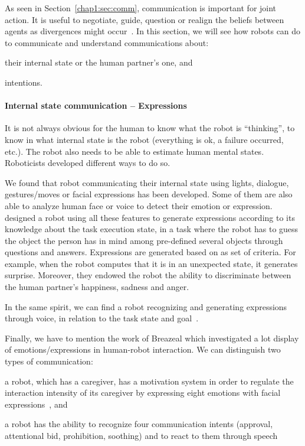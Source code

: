 \documentclass[a4paper,11pt,twoside]{StyleThese}
\begin{document}
As seen in Section~\ref{chap1:sec:comm}, communication is important for joint action. It is useful to negotiate, guide, question or realign the beliefs between agents as divergences might occur~\citep{cohen_1991_teamwork}. In this section, we will see how robots can do to communicate and understand communications about: 
\begin{inlineEnumerate}
	\item their internal state or the human partner's one, and
	\item intentions.
\end{inlineEnumerate}

\paragraph{Internal state communication -- Expressions}
It is not always obvious for the human to know what the robot is ``thinking'', \ie to know in what internal state is the robot (\eg everything is ok, a failure occurred, etc.). The robot also needs to be able to estimate human mental states. Roboticists developed different ways to do so. 

We found that robot communicating their internal state using lights, dialogue, gestures/moves or facial expressions has been developed. Some of them are also able to analyze human face or voice to detect their emotion or expression. \cite{kim_2010_computational} designed a robot using all these features to generate expressions according to its knowledge about the task execution state, in a task where the robot has to guess the object the person has in mind among pre-defined several objects through questions and answers. Expressions are generated based on as set of criteria. For example, when the robot computes that it is in an unexpected state, it generates surprise. Moreover, they endowed the robot the ability to discriminate between the human partner's happiness, sadness and anger. 

In the same spirit, we can find a robot recognizing and generating expressions through voice, in relation to the task state and goal~\citep{scheutz_2006_utility}. 

Finally, we have to mention the work of Breazeal which investigated a lot display of emotions/expressions in human-robot interaction. We can distinguish two types of communication:
\begin{inlineEnumerate}
	\item a robot, which has a caregiver, has a motivation system in order to regulate the interaction intensity of its caregiver by expressing eight emotions with facial expressions~\citep{breazeal_1998_motivational, breazeal_2004_function}, and
	\item a robot has the ability to recognize four communication intents (approval, attentional bid, prohibition, soothing) and to react to them through speech~\citep{breazeal_2002_regulation, breazeal_2003_emotion}
\end{inlineEnumerate}
\end{document}
